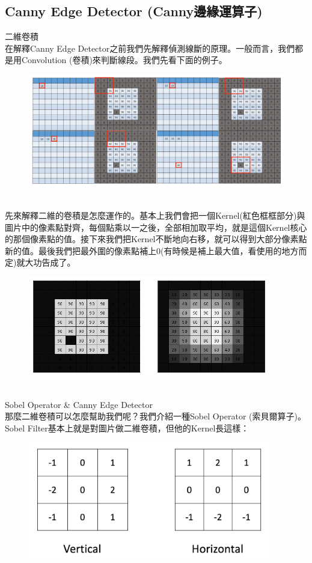 \documentclass{article}
\begin{document}
\subsection{Canny Edge Detector (Canny邊緣運算子)}
二維卷積
\\在解釋Canny Edge Detector之前我們先解釋偵測線斷的原理。一般而言，我們都是用Convolution (卷積)來判斷線段。我們先看下面的例子。
\begin{figure}[htp]
    \begin{center}
        \includegraphics[width=450pt]{pic/3_2_3.png}
    \end{center}
\end{figure}
\\
先來解釋二維的卷積是怎麼運作的。基本上我們會把一個Kernel(紅色框框部分)與圖片中的像素點對齊，每個點乘以一之後，全部相加取平均，就是這個Kernel核心的那個像素點的值。接下來我們把Kernel不斷地向右移，就可以得到大部分像素點新的值。最後我們把最外圍的像素點補上0(有時候是補上最大值，看使用的地方而定)就大功告成了。
\begin{figure}[htp]
    \begin{center}
        \includegraphics[width=300pt]{pic/3_2_4.png}
    \end{center}
\end{figure}
\\
Sobel Operator \& Canny Edge Detector
\\那麼二維卷積可以怎麼幫助我們呢？我們介紹一種Sobel Operator (索貝爾算子)。Sobel Filter基本上就是對圖片做二維卷積，但他的Kernel長這樣：
\begin{figure}[htp]
    \begin{center}
        \includegraphics[width=300pt]{pic/3_2_5.png}
    \end{center}
\end{figure}
\end{document}
